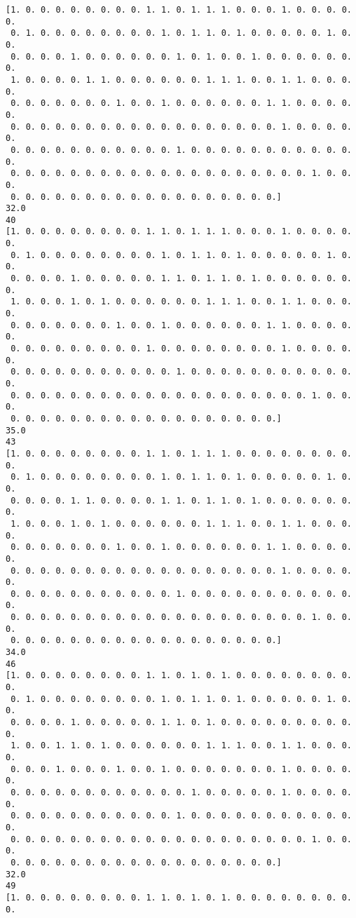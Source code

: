 \documentclass[11pt]{article}
\begin{document}
\begin{Verbatim}[commandchars=\\\{\}]
[1. 0. 0. 0. 0. 0. 0. 0. 0. 1. 1. 0. 1. 1. 1. 0. 0. 0. 1. 0. 0. 0. 0. 0.
 0. 1. 0. 0. 0. 0. 0. 0. 0. 0. 1. 0. 1. 1. 0. 1. 0. 0. 0. 0. 0. 1. 0. 0.
 0. 0. 0. 0. 1. 0. 0. 0. 0. 0. 0. 1. 0. 1. 0. 0. 1. 0. 0. 0. 0. 0. 0. 0.
 1. 0. 0. 0. 0. 1. 1. 0. 0. 0. 0. 0. 0. 1. 1. 1. 0. 0. 1. 1. 0. 0. 0. 0.
 0. 0. 0. 0. 0. 0. 0. 1. 0. 0. 1. 0. 0. 0. 0. 0. 0. 1. 1. 0. 0. 0. 0. 0.
 0. 0. 0. 0. 0. 0. 0. 0. 0. 0. 0. 0. 0. 0. 0. 0. 0. 0. 1. 0. 0. 0. 0. 0.
 0. 0. 0. 0. 0. 0. 0. 0. 0. 0. 0. 1. 0. 0. 0. 0. 0. 0. 0. 0. 0. 0. 0. 0.
 0. 0. 0. 0. 0. 0. 0. 0. 0. 0. 0. 0. 0. 0. 0. 0. 0. 0. 0. 0. 1. 0. 0. 0.
 0. 0. 0. 0. 0. 0. 0. 0. 0. 0. 0. 0. 0. 0. 0. 0. 0. 0.]
32.0
40
[1. 0. 0. 0. 0. 0. 0. 0. 0. 1. 1. 0. 1. 1. 1. 0. 0. 0. 1. 0. 0. 0. 0. 0.
 0. 1. 0. 0. 0. 0. 0. 0. 0. 0. 1. 0. 1. 1. 0. 1. 0. 0. 0. 0. 0. 1. 0. 0.
 0. 0. 0. 0. 1. 0. 0. 0. 0. 0. 1. 1. 0. 1. 1. 0. 1. 0. 0. 0. 0. 0. 0. 0.
 1. 0. 0. 0. 1. 0. 1. 0. 0. 0. 0. 0. 0. 1. 1. 1. 0. 0. 1. 1. 0. 0. 0. 0.
 0. 0. 0. 0. 0. 0. 0. 1. 0. 0. 1. 0. 0. 0. 0. 0. 0. 1. 1. 0. 0. 0. 0. 0.
 0. 0. 0. 0. 0. 0. 0. 0. 0. 1. 0. 0. 0. 0. 0. 0. 0. 0. 1. 0. 0. 0. 0. 0.
 0. 0. 0. 0. 0. 0. 0. 0. 0. 0. 0. 1. 0. 0. 0. 0. 0. 0. 0. 0. 0. 0. 0. 0.
 0. 0. 0. 0. 0. 0. 0. 0. 0. 0. 0. 0. 0. 0. 0. 0. 0. 0. 0. 0. 1. 0. 0. 0.
 0. 0. 0. 0. 0. 0. 0. 0. 0. 0. 0. 0. 0. 0. 0. 0. 0. 0.]
35.0
43
[1. 0. 0. 0. 0. 0. 0. 0. 0. 1. 1. 0. 1. 1. 1. 0. 0. 0. 0. 0. 0. 0. 0. 0.
 0. 1. 0. 0. 0. 0. 0. 0. 0. 0. 1. 0. 1. 1. 0. 1. 0. 0. 0. 0. 0. 1. 0. 0.
 0. 0. 0. 0. 1. 1. 0. 0. 0. 0. 1. 1. 0. 1. 1. 0. 1. 0. 0. 0. 0. 0. 0. 0.
 1. 0. 0. 0. 1. 0. 1. 0. 0. 0. 0. 0. 0. 1. 1. 1. 0. 0. 1. 1. 0. 0. 0. 0.
 0. 0. 0. 0. 0. 0. 0. 1. 0. 0. 1. 0. 0. 0. 0. 0. 0. 1. 1. 0. 0. 0. 0. 0.
 0. 0. 0. 0. 0. 0. 0. 0. 0. 0. 0. 0. 0. 0. 0. 0. 0. 0. 1. 0. 0. 0. 0. 0.
 0. 0. 0. 0. 0. 0. 0. 0. 0. 0. 0. 1. 0. 0. 0. 0. 0. 0. 0. 0. 0. 0. 0. 0.
 0. 0. 0. 0. 0. 0. 0. 0. 0. 0. 0. 0. 0. 0. 0. 0. 0. 0. 0. 0. 1. 0. 0. 0.
 0. 0. 0. 0. 0. 0. 0. 0. 0. 0. 0. 0. 0. 0. 0. 0. 0. 0.]
34.0
46
[1. 0. 0. 0. 0. 0. 0. 0. 0. 1. 1. 0. 1. 0. 1. 0. 0. 0. 0. 0. 0. 0. 0. 0.
 0. 1. 0. 0. 0. 0. 0. 0. 0. 0. 1. 0. 1. 1. 0. 1. 0. 0. 0. 0. 0. 1. 0. 0.
 0. 0. 0. 0. 1. 0. 0. 0. 0. 0. 1. 1. 0. 1. 0. 0. 0. 0. 0. 0. 0. 0. 0. 0.
 1. 0. 0. 1. 1. 0. 1. 0. 0. 0. 0. 0. 0. 1. 1. 1. 0. 0. 1. 1. 0. 0. 0. 0.
 0. 0. 0. 1. 0. 0. 0. 1. 0. 0. 1. 0. 0. 0. 0. 0. 0. 0. 1. 0. 0. 0. 0. 0.
 0. 0. 0. 0. 0. 0. 0. 0. 0. 0. 0. 0. 1. 0. 0. 0. 0. 0. 1. 0. 0. 0. 0. 0.
 0. 0. 0. 0. 0. 0. 0. 0. 0. 0. 0. 1. 0. 0. 0. 0. 0. 0. 0. 0. 0. 0. 0. 0.
 0. 0. 0. 0. 0. 0. 0. 0. 0. 0. 0. 0. 0. 0. 0. 0. 0. 0. 0. 0. 1. 0. 0. 0.
 0. 0. 0. 0. 0. 0. 0. 0. 0. 0. 0. 0. 0. 0. 0. 0. 0. 0.]
32.0
49
[1. 0. 0. 0. 0. 0. 0. 0. 0. 1. 1. 0. 1. 0. 1. 0. 0. 0. 0. 0. 0. 0. 0. 0.

\end{Verbatim}
\end{document}
